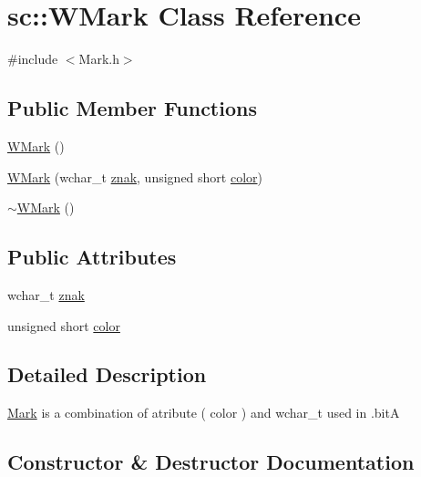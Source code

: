 \hypertarget{classsc_1_1_w_mark}{}\section{sc\+::W\+Mark Class Reference}
\label{classsc_1_1_w_mark}


{\ttfamily \#include $<$Mark.\+h$>$}

\subsection*{Public Member Functions}
\begin{DoxyCompactItemize}
\item 
\mbox{\hyperlink{classsc_1_1_w_mark_ad1f13f92353955e5825124938ff16fc0}{W\+Mark}} ()
\item 
\mbox{\hyperlink{classsc_1_1_w_mark_ac1a4b8f82dac4a4cbeca351595e3e3f8}{W\+Mark}} (wchar\+\_\+t \mbox{\hyperlink{classsc_1_1_w_mark_a0d33290f76e7088111fcea6a42e1646d}{znak}}, unsigned short \mbox{\hyperlink{classsc_1_1_w_mark_a0e65a03e3f7da35a2a24a83942cad9cd}{color}})
\item 
\mbox{\hyperlink{classsc_1_1_w_mark_aa9b238a1e82030750453619de2da7cff}{$\sim$\+W\+Mark}} ()
\end{DoxyCompactItemize}
\subsection*{Public Attributes}
\begin{DoxyCompactItemize}
\item 
wchar\+\_\+t \mbox{\hyperlink{classsc_1_1_w_mark_a0d33290f76e7088111fcea6a42e1646d}{znak}}
\item 
unsigned short \mbox{\hyperlink{classsc_1_1_w_mark_a0e65a03e3f7da35a2a24a83942cad9cd}{color}}
\end{DoxyCompactItemize}


\subsection{Detailed Description}
\mbox{\hyperlink{classsc_1_1_mark}{Mark}} is a combination of atribute ( color ) and wchar\+\_\+t used in .bitA 

\subsection{Constructor \& Destructor Documentation}
\mbox{\label{classsc_1_1_w_mark_ad1f13f92353955e5825124938ff16fc0}} 
